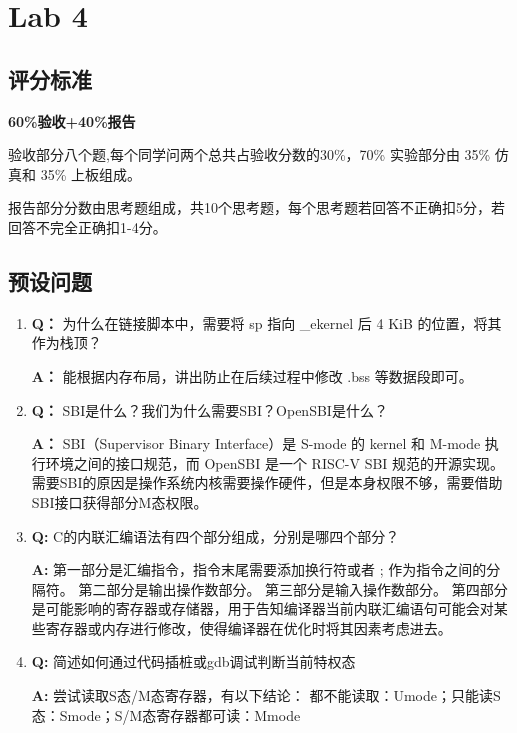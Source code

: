\chapter{Lab 4}


\section{评分标准}
\textbf{60\%验收+40\%报告}

验收部分八个题,每个同学问两个总共占验收分数的30\%，70\% 实验部分由 35\% 仿真和 35\% 上板组成。

报告部分分数由思考题组成，共10个思考题，每个思考题若回答不正确扣5分，若回答不完全正确扣1-4分。


\section{预设问题}

\begin{enumerate}
    \item \textbf{Q：}
    为什么在链接脚本中，需要将 sp 指向 \_ekernel 后 4 KiB 的位置，将其作为栈顶？

    \textbf{A：}
    能根据内存布局，讲出防止在后续过程中修改 .bss 等数据段即可。

    \item \textbf{Q：}
    SBI是什么？我们为什么需要SBI？OpenSBI是什么？

    \textbf{A：}
    SBI（Supervisor Binary Interface）是 S-mode 的 kernel 和 M-mode 执行环境之间的接口规范，而 OpenSBI 是一个 RISC-V SBI 规范的开源实现。需要SBI的原因是操作系统内核需要操作硬件，但是本身权限不够，需要借助SBI接口获得部分M态权限。

    \item \textbf{Q:}
    C的内联汇编语法有四个部分组成，分别是哪四个部分？

    \textbf{A:}
    第一部分是汇编指令，指令末尾需要添加换行符或者 ; 作为指令之间的分隔符。
    第二部分是输出操作数部分。
    第三部分是输入操作数部分。
    第四部分是可能影响的寄存器或存储器，用于告知编译器当前内联汇编语句可能会对某些寄存器或内存进行修改，使得编译器在优化时将其因素考虑进去。

    \item \textbf{Q:}
    简述如何通过代码插桩或gdb调试判断当前特权态

    \textbf{A:}
    尝试读取S态/M态寄存器，有以下结论：
    都不能读取：Umode；只能读S态：Smode；S/M态寄存器都可读：Mmode

    

    

    

\end{enumerate}